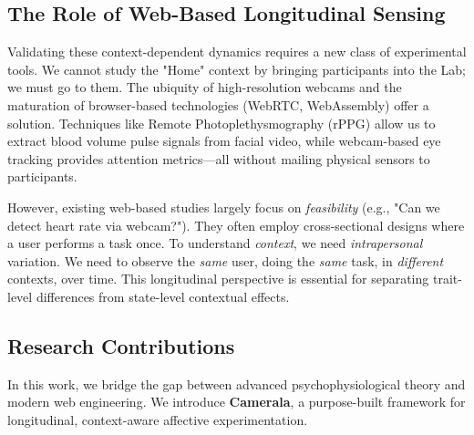 \documentclass[journal]{IEEEtran}
\begin{document}
\subsection{The Role of Web-Based Longitudinal Sensing}
Validating these context-dependent dynamics requires a new class of experimental tools. We cannot study the "Home" context by bringing participants into the Lab; we must go to them.
The ubiquity of high-resolution webcams and the maturation of browser-based technologies (WebRTC, WebAssembly) offer a solution. Techniques like Remote Photoplethysmography (rPPG) \cite{mcduff_rppg} allow us to extract blood volume pulse signals from facial video, while webcam-based eye tracking \cite{webgazer} provides attention metrics—all without mailing physical sensors to participants.

However, existing web-based studies largely focus on \textit{feasibility} (e.g., "Can we detect heart rate via webcam?"). They often employ cross-sectional designs where a user performs a task once. To understand \textit{context}, we need \textit{intrapersonal} variation. We need to observe the \textit{same} user, doing the \textit{same} task, in \textit{different} contexts, over time. This longitudinal perspective is essential for separating trait-level differences from state-level contextual effects.

\subsection{Research Contributions}
In this work, we bridge the gap between advanced psychophysiological theory and modern web engineering. We introduce \textbf{Camerala}, a purpose-built framework for longitudinal, context-aware affective experimentation.
\end{document}
